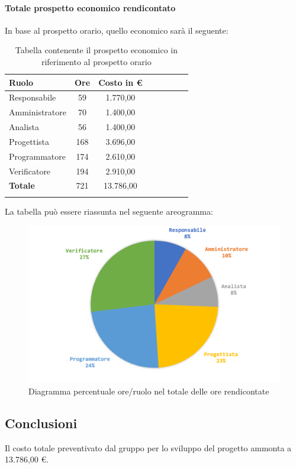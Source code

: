 				\paragraph{Totale prospetto economico rendicontato}
				In base al prospetto orario, quello economico sarà il seguente: 
				
				\begin{longtable}{|l|c|c|c|c|c|c|c|}
					\hline
					\rowcolor{lighter-grayer}
					\textbf{Ruolo} & \textbf{Ore} & \textbf{Costo in €} \\
					\hline
					\endfirsthead
					
					\hline
					Responsabile 	    & 59 & 1.770,00\\
					\hline 
					\hline
					Amministratore	  & 70 & 1.400,00\\
					\hline
					\hline
					Analista 				& 56 & 1.400,00\\
					\hline
					\hline
					Progettista 		  & 168 & 3.696,00\\
					\hline
					\hline
					Programmatore 	 & 174 & 2.610,00\\
					\hline
					\hline
					Verificatore 		  & 194 & 2.910,00\\
					\hline
					\textbf{Totale} 	& 721 & 13.786,00\\
					\hline
					\caption{Tabella contenente il prospetto economico in riferimento al prospetto orario}
				\end{longtable}

				
				La tabella può essere riassunta nel seguente areogramma:
				\begin{figure}[H]
					\centering
					\includegraphics[width=0.8\linewidth]{./images/preventivo/totOreRed2.png}
					\caption{Diagramma percentuale ore/ruolo nel totale delle ore rendicontate}
					\label{fig:diagramma costi ruolo fase totale ore rendicontate}
				\end{figure}
				
			
			\subsection{Conclusioni}
				Il costo totale preventivato dal gruppo per lo sviluppo del progetto ammonta a 13.786,00 €.
				
				
		
	
	